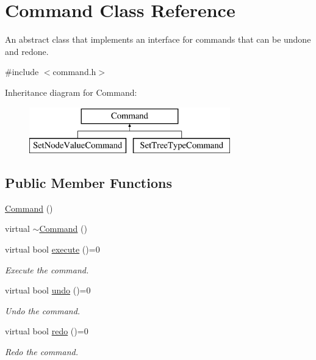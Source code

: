 \hypertarget{class_command}{}\section{Command Class Reference}
\label{class_command}


An abstract class that implements an interface for commands that can be undone and redone.  




{\ttfamily \#include $<$command.\+h$>$}

Inheritance diagram for Command\+:\begin{figure}[H]
\begin{center}
\leavevmode
\includegraphics[height=2.000000cm]{d5/d6a/class_command}
\end{center}
\end{figure}
\subsection*{Public Member Functions}
\begin{DoxyCompactItemize}
\item 
\mbox{\hyperlink{class_command_a18df2d81039392daeb0b78c346a70537}{Command}} ()
\item 
virtual \mbox{\hyperlink{class_command_ab552bb3a07fdd1acbfd8ea76e69b2278}{$\sim$\+Command}} ()
\item 
virtual bool \mbox{\hyperlink{class_command_a5d83cdea649a79d7b7253196a6deddeb}{execute}} ()=0
\begin{DoxyCompactList}\small\item\em Execute the command. \end{DoxyCompactList}\item 
virtual bool \mbox{\hyperlink{class_command_aa89348c98fd2194f1617d70f57a3ae6c}{undo}} ()=0
\begin{DoxyCompactList}\small\item\em Undo the command. \end{DoxyCompactList}\item 
virtual bool \mbox{\hyperlink{class_command_ab222d875ec449c40467173edb28e5460}{redo}} ()=0
\begin{DoxyCompactList}\small\item\em Redo the command. \end{DoxyCompactList}\end{DoxyCompactItemize}


